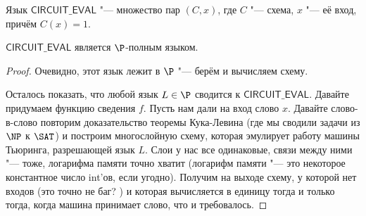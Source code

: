 	\begin{Def}
		Язык $\mathsf{CIRCUIT\_EVAL}$ "--- множество пар $(C, x)$, где $C$ "--- схема, $x$ "--- её вход, причём $C(x)=1$.
	\end{Def}
	\begin{assertion}
		$\mathsf{CIRCUIT\_EVAL}$ является $\P$-полным языком.
	\end{assertion}
	\begin{proof}
		Очевидно, этот язык лежит в $\P$ "--- берём и вычисляем схему.

		Осталось показать, что любой язык $L \in \P$ сводится к $\mathsf{CIRCUIT\_EVAL}$.
		Давайте придумаем функцию сведения $f$.
		Пусть нам дали на вход слово $x$.
		Давайте слово-в-слово повторим доказательство теоремы Кука-Левина (где мы сводили задачи из $\NP$ к $\SAT$) и построим
		многослойную схему, которая эмулирует работу машины Тьюринга, разрешающей язык $L$.
		Слои у нас все одинаковые, связи между ними "--- тоже, логарифма памяти точно хватит (логарифм памяти "--- это некоторое константное число int'ов, если угодно).
		Получим на выходе схему, у которой нет входов (это точно не баг? \TODO) и которая вычисляется в единицу тогда и только тогда, когда машина принимает слово, что и требовалось.
	\end{proof}

